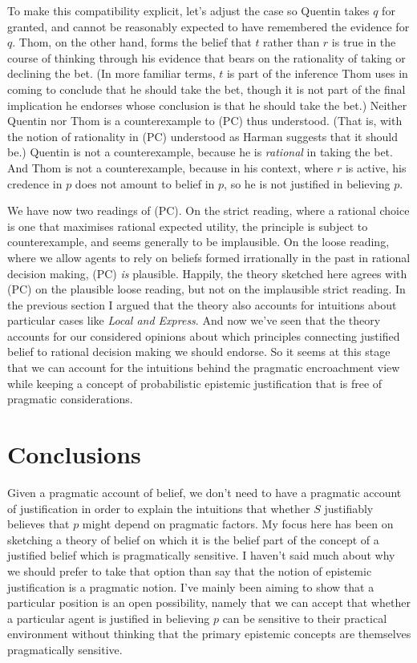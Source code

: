 To make this compatibility explicit, let's adjust the case so Quentin takes \(q\) for granted, and cannot be reasonably expected to have remembered the evidence for \(q\). Thom, on the other hand, forms the belief that \(t\) rather than \(r\) is true in the course of thinking through his evidence that bears on the rationality of taking or declining the bet. (In more familiar terms, \(t\) is part of the inference Thom uses in coming to conclude that he should take the bet, though it is not part of the final implication he endorses whose conclusion is that he should take the bet.) Neither Quentin nor Thom is a counterexample to (PC) thus understood. (That is, with the notion of rationality in (PC) understood as Harman suggests that it should be.) Quentin is not a counterexample, because he is \textit{rational} in taking the bet. And Thom is not a counterexample, because in his context, where \(r\) is active, his credence in \(p\) does not amount to belief in \(p\), so he is not justified in believing \(p\).

We have now two readings of (PC). On the strict reading, where a rational choice is one that maximises rational expected utility, the principle is subject to counterexample, and seems generally to be implausible. On the loose reading, where we allow agents to rely on beliefs formed irrationally in the past in rational decision making, (PC) \textit{is} plausible. Happily, the theory sketched here agrees with (PC) on the plausible loose reading, but not on the implausible strict reading. In the previous section I argued that the theory also accounts for intuitions about particular cases like \textit{Local and Express}. And now we've seen that the theory accounts for our considered opinions about which principles connecting justified belief to rational decision making we should endorse. So it seems at this stage that we can account for the intuitions behind the pragmatic encroachment view while keeping a concept of probabilistic epistemic justification that is free of pragmatic considerations.

\section{Conclusions}

Given a pragmatic account of belief, we don't need to have a pragmatic account of justification in order to explain the intuitions that whether \(S\)  justifiably believes that \(p\) might depend on pragmatic factors. My focus here has been on sketching a theory of belief on which it is the belief part of the concept of a justified belief which is pragmatically sensitive. I haven't said much about why we should prefer to take that option than say that the notion of epistemic justification is a pragmatic notion. I've mainly been aiming to show that a particular position is an open possibility, namely that we can accept that whether a particular agent is justified in believing \(p\) can be sensitive to their practical environment without thinking that the primary epistemic concepts are themselves pragmatically sensitive.
